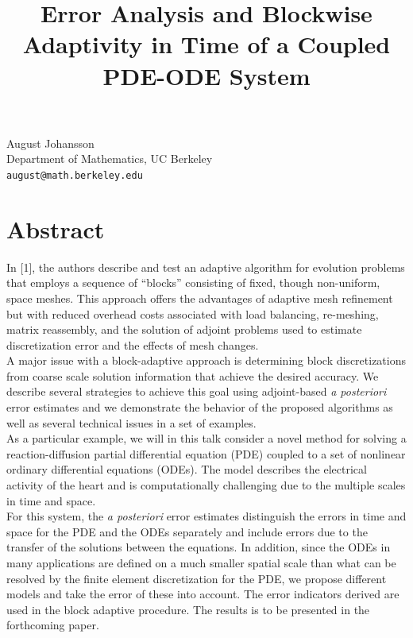 \documentclass[article,A4,11pt]{llncs}%
\begin{document}
\title{Error Analysis and Blockwise Adaptivity in Time of a Coupled PDE-ODE System}
 \author{} \institute{}
\maketitle
\begin{center}
{\large August  Johansson}\\
Department of Mathematics, UC Berkeley\\
{\tt august@math.berkeley.edu}
\end{center}

\section*{Abstract}
In [1], the authors describe and test an adaptive algorithm for evolution problems that employs a sequence of ``blocks'' consisting of fixed, though non-uniform, space meshes. This approach offers the advantages of adaptive mesh refinement but with reduced overhead costs associated with load balancing, re-meshing, matrix reassembly, and the solution of adjoint problems used to estimate discretization error and the effects of mesh changes.\\

A major issue with a block-adaptive approach is determining block discretizations from coarse scale solution information that achieve the desired accuracy. We describe several strategies to achieve this goal using adjoint-based {\em a posteriori} error estimates and we demonstrate the behavior of the proposed algorithms as well as several technical issues in a set of examples.\\

As a particular example, we will in this talk consider a novel method for solving a reaction-diffusion partial differential equation (PDE) coupled to a set of nonlinear ordinary differential equations (ODEs). The model describes the electrical activity of the heart and is computationally challenging due to the multiple scales in time and space.\\

For this system, the {\em a posteriori} error estimates distinguish the errors in time and space for the PDE and the ODEs separately and include errors due to the transfer of the solutions between the equations. In addition, since the ODEs in many applications are defined on a much smaller spatial scale than what can be resolved by the finite element discretization for the PDE, we propose different models and take the error of these into account. The error indicators derived are used in the block adaptive procedure. The results is to be presented in the forthcoming paper.
\end{document}
